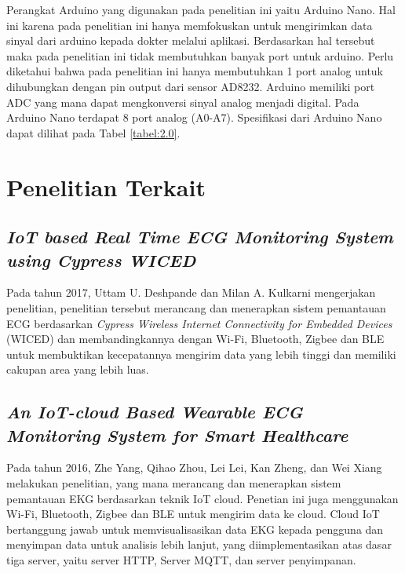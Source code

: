  Perangkat Arduino yang digunakan pada penelitian ini yaitu Arduino Nano. Hal ini karena pada penelitian ini hanya memfokuskan untuk mengirimkan data sinyal dari arduino kepada dokter melalui aplikasi. Berdasarkan hal tersebut maka pada penelitian ini tidak membutuhkan banyak port untuk arduino. Perlu diketahui bahwa pada penelitian ini hanya membutuhkan 1 port analog untuk dihubungkan dengan pin output dari sensor AD8232. Arduino memiliki port ADC yang mana dapat mengkonversi sinyal analog menjadi digital. Pada Arduino Nano terdapat 8 port analog (A0-A7).  Spesifikasi dari Arduino Nano dapat dilihat pada Tabel \ref{tabel:2.0}.
 \clearpage
 

\vspace{1ex}






\section{Penelitian Terkait}
\vspace{1ex}

\subsection{\textit{IoT based Real Time ECG Monitoring System using Cypress WICED}}
\vspace{1ex}
Pada tahun 2017, Uttam U. Deshpande dan Milan A. Kulkarni mengerjakan penelitian, penelitian tersebut merancang dan menerapkan sistem pemantauan ECG berdasarkan \textit{Cypress Wireless Internet Connectivity for Embedded Devices} (WICED) dan membandingkannya dengan  Wi-Fi, Bluetooth, Zigbee dan BLE untuk membuktikan kecepatannya mengirim data yang lebih tinggi dan memiliki cakupan area yang lebih luas.\cite{cit:4}
\vspace{1ex}

\subsection{\textit{An IoT-cloud Based Wearable ECG Monitoring System for Smart Healthcare}}
\vspace{1ex}

Pada tahun 2016, Zhe Yang, Qihao Zhou, Lei Lei, Kan Zheng, dan Wei Xiang melakukan penelitian, yang mana merancang dan menerapkan sistem pemantauan EKG berdasarkan teknik IoT cloud. Penetian ini juga menggunakan Wi-Fi, Bluetooth, Zigbee dan BLE untuk mengirim data ke cloud. Cloud IoT bertanggung jawab untuk memvisualisasikan data EKG kepada pengguna dan menyimpan data untuk analisis lebih lanjut, yang diimplementasikan atas dasar tiga server, yaitu server HTTP, Server MQTT, dan server penyimpanan.\cite{cit:7}
\vspace{1ex}


